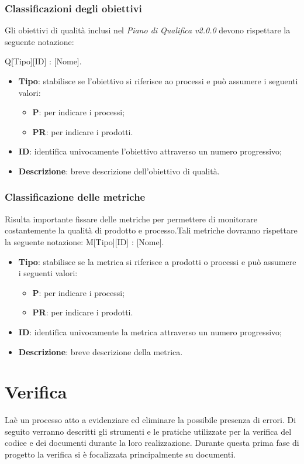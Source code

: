 \subsubsection{Classificazioni degli obiettivi} 
Gli obiettivi di qualità inclusi nel \textit{Piano di Qualifica v2.0.0} devono rispettare la seguente notazione: \\
\begin{center}
Q[Tipo][ID] : [Nome].
\end{center}
\begin{itemize}
	\item \textbf{Tipo}: stabilisce se l'obiettivo si riferisce ao processi e può assumere i seguenti valori:
	\begin{itemize}
		\item \textbf{P}: per indicare i processi;
		\item \textbf{PR}: per indicare i prodotti.
	\end{itemize}
	\item \textbf{ID}: identifica univocamente l'obiettivo attraverso un numero progressivo;
	\item \textbf{Descrizione}: breve descrizione dell'obiettivo di qualità.
\end{itemize}
\subsubsection{Classificazione delle metriche}
Risulta importante fissare delle metriche per permettere di monitorare costantemente la qualità di prodotto e processo.Tali metriche dovranno rispettare la seguente notazione:
M[Tipo][ID] : [Nome].\\
\begin{itemize}
	\item \textbf{Tipo}: stabilisce se la metrica si riferisce a prodotti o processi e può assumere i seguenti valori:
	\begin{itemize}
		\item \textbf{P}: per indicare i processi;
		\item \textbf{PR}: per indicare i prodotti.
	\end{itemize}
	\item \textbf{ID}: identifica univocamente la metrica attraverso un numero progressivo;
	\item \textbf{Descrizione}: breve descrizione della metrica.
\end{itemize}

\section{Verifica}
Laè un processo atto a evidenziare ed eliminare la possibile presenza di errori.
Di seguito verranno descritti gli strumenti e le pratiche utilizzate per la verifica del codice e dei documenti durante la loro realizzazione.
Durante questa prima fase di progetto la verifica si è focalizzata principalmente su documenti.
